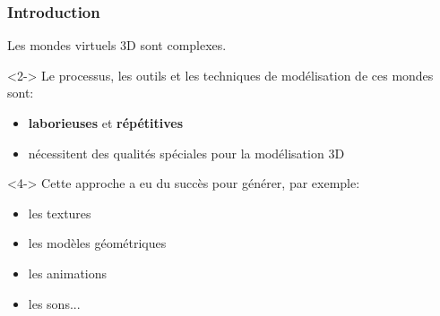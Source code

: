 \documentclass{beamer}
\begin{document}
\begin{frame}
\frametitle{Introduction}
Les mondes virtuels 3D sont complexes. 

\begin{uncoverenv}<2->
Le processus, les outils et les techniques de modélisation de ces mondes sont:
\begin{itemize}
	\item \textbf{laborieuses} et \textbf{répétitives}
	\item nécessitent des qualités spéciales pour la modélisation 3D \newline
\end{itemize}
\end{uncoverenv}

\newline

\begin{uncoverenv}<4->
Cette approche a eu du succès pour générer, par exemple:
\begin{itemize}
	\item les textures
	\item les modèles géométriques
	\item les animations
	\item les sons...\newline
\end{itemize}
\end{uncoverenv}

\end{frame}
\end{document}
